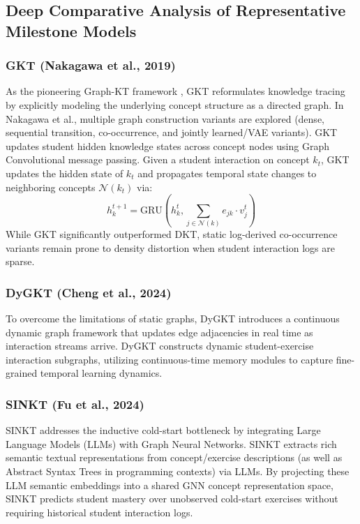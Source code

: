 \documentclass[10pt,journal,compsoc]{IEEEtran}
\begin{document}
\subsection{Deep Comparative Analysis of Representative Milestone Models}

\subsubsection{GKT (Nakagawa et al., 2019)}
As the pioneering Graph-KT framework \cite{KT004_GKT_2019}, GKT reformulates knowledge tracing by explicitly modeling the underlying concept structure as a directed graph. In Nakagawa et al., multiple graph construction variants are explored (dense, sequential transition, co-occurrence, and jointly learned/VAE variants). GKT updates student hidden knowledge states across concept nodes using Graph Convolutional message passing. Given a student interaction on concept $k_t$, GKT updates the hidden state of $k_t$ and propagates temporal state changes to neighboring concepts $\mathcal{N}(k_t)$ via:
\begin{equation}
h_{k}^{t+1} = \text{GRU}\left( h_{k}^{t}, \sum_{j \in \mathcal{N}(k)} e_{jk} \cdot v_{j}^t \right)
\end{equation}
While GKT significantly outperformed DKT, static log-derived co-occurrence variants remain prone to density distortion when student interaction logs are sparse.

\subsubsection{DyGKT (Cheng et al., 2024)}
To overcome the limitations of static graphs, DyGKT \cite{KT038_DyGKT_2024} introduces a continuous dynamic graph framework that updates edge adjacencies in real time as interaction streams arrive. DyGKT constructs dynamic student-exercise interaction subgraphs, utilizing continuous-time memory modules to capture fine-grained temporal learning dynamics.

\subsubsection{SINKT (Fu et al., 2024)}
SINKT \cite{KT044_SINKT_2024} addresses the inductive cold-start bottleneck by integrating Large Language Models (LLMs) with Graph Neural Networks. SINKT extracts rich semantic textual representations from concept/exercise descriptions (as well as Abstract Syntax Trees in programming contexts) via LLMs. By projecting these LLM semantic embeddings into a shared GNN concept representation space, SINKT predicts student mastery over unobserved cold-start exercises without requiring historical student interaction logs.
\end{document}
